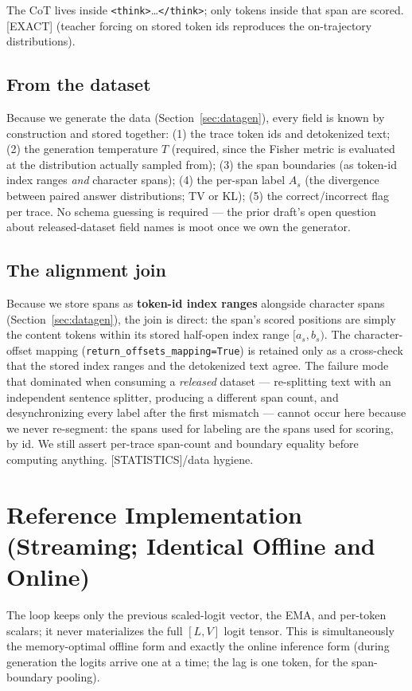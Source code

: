\documentclass[11pt]{article}
\begin{document}
The CoT lives inside \texttt{<think>}\ldots\texttt{</think>}; only tokens inside that span are scored. \textsf{[EXACT]} (teacher forcing on stored token ids reproduces the on-trajectory distributions).

\subsection{From the dataset}
Because we generate the data (Section~\ref{sec:datagen}), every field is known by construction and stored together: (1) the trace token ids and detokenized text; (2) the generation temperature $T$ (required, since the Fisher metric is evaluated at the distribution actually sampled from); (3) the span boundaries (as token-id index ranges \emph{and} character spans); (4) the per-span label $A_s$ (the divergence between paired answer distributions; TV or KL); (5) the correct/incorrect flag per trace. No schema guessing is required --- the prior draft's open question about released-dataset field names is moot once we own the generator.

\subsection{The alignment join}
Because we store spans as \textbf{token-id index ranges} alongside character spans (Section~\ref{sec:datagen}), the join is direct: the span's scored positions are simply the content tokens within its stored half-open index range $[a_s, b_s)$. The character-offset mapping (\texttt{return\_offsets\_mapping=True}) is retained only as a cross-check that the stored index ranges and the detokenized text agree. The failure mode that dominated when consuming a \emph{released} dataset --- re-splitting text with an independent sentence splitter, producing a different span count, and desynchronizing every label after the first mismatch --- cannot occur here because we never re-segment: the spans used for labeling are the spans used for scoring, by id. We still assert per-trace span-count and boundary equality before computing anything. \textsf{[STATISTICS]}/data hygiene.

\section{Reference Implementation (Streaming; Identical Offline and Online)}

The loop keeps only the previous scaled-logit vector, the EMA, and per-token scalars; it never materializes the full $[L,V]$ logit tensor. This is simultaneously the memory-optimal offline form and exactly the online inference form (during generation the logits arrive one at a time; the lag is one token, for the span-boundary pooling).
\end{document}
